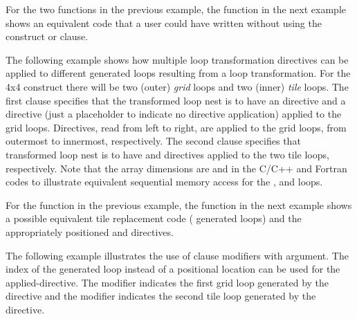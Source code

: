 
For the two functions in the previous example,
the  function in the next example shows an equivalent
code that a user could have written without using the  construct
or  clause.



The following example shows how multiple loop transformation directives
can be applied to different generated loops resulting from a loop transformation.
For the 4x4  construct there will be two (outer) \emph{grid} loops
and two (inner) \emph{tile} loops. The first  clause specifies
that the transformed loop nest is to have an  directive and
a  directive (just a placeholder to indicate no directive
application) applied to the grid loops. Directives, read from left to right,
are applied to the grid loops, from outermost to innermost, respectively. The
second  clause specifies that transformed loop nest is to have
 and  directives applied to the two tile
loops, respectively. Note that the  array dimensions are
 and  in the C/C++ and Fortran
codes to illustrate equivalent sequential memory access for the ,
 and  loops.


\pagebreak
{}

For the function in the previous example,
the  function in the next example shows a possible
equivalent tile replacement code ( generated loops) and the
appropriately positioned  and  directives.

\pagebreak
{}



The following example illustrates the use of  clause 
modifiers with argument. The index of the generated loop instead of
a positional location can be used for the applied-directive. 
The  modifier indicates the first grid loop 
generated by the  directive
and the  modifier indicates the second tile loop
generated by the  directive.


